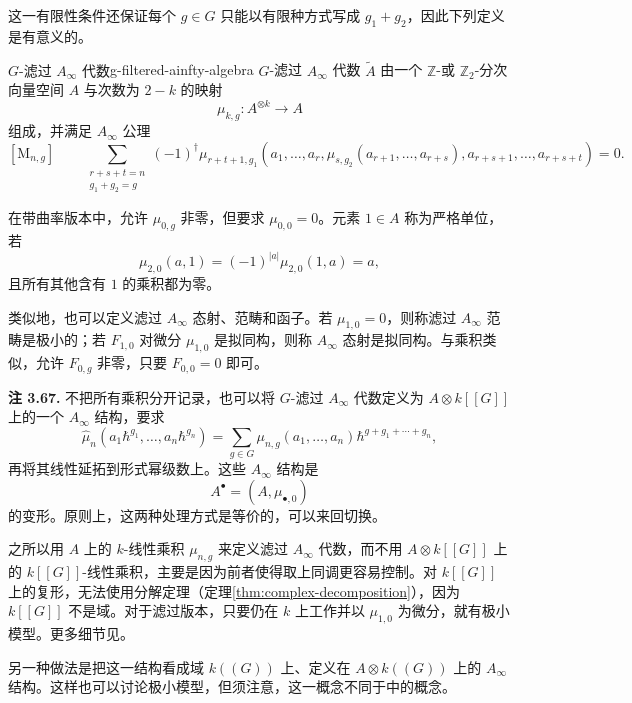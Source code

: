 这一有限性条件还保证每个 $g\in G$ 只能以有限种方式写成 $g_1+g_2$，因此下列定义是有意义的。

\begin{definition}{$G$-滤过 $A_\infty$ 代数}{g-filtered-ainfty-algebra}
$G$-滤过 $A_\infty$ 代数 $\widetilde A$ 由一个 $\mathbb Z$-或 $\mathbb Z_2$-分次向量空间 $A$ 与次数为 $2-k$ 的映射
\[
  \mu_{k,g}\colon A^{\otimes k}\to A
\]
组成，并满足 $A_\infty$ 公理
\[
  [\mathrm M_{n,g}]\qquad
  \sum_{\substack{r+s+t=n\\g_1+g_2=g}}
  (-1)^\dagger\mu_{r+t+1,g_1}
  (a_1,\ldots,a_r,\mu_{s,g_2}(a_{r+1},\ldots,a_{r+s}),
  a_{r+s+1},\ldots,a_{r+s+t})=0.
\]
\end{definition}

在带曲率版本中，允许 $\mu_{0,g}$ 非零，但要求 $\mu_{0,0}=0$。元素 $1\in A$ 称为严格单位，若
\[
  \mu_{2,0}(a,1)=(-1)^{|a|}\mu_{2,0}(1,a)=a,
\]
且所有其他含有 $1$ 的乘积都为零。

类似地，也可以定义滤过 $A_\infty$ 态射、范畴和函子。若 $\mu_{1,0}=0$，则称滤过 $A_\infty$ 范畴是极小的；若 $F_{1,0}$ 对微分 $\mu_{1,0}$ 是拟同构，则称 $A_\infty$ 态射是拟同构。与乘积类似，允许 $F_{0,g}$ 非零，只要 $F_{0,0}=0$ 即可。

\begin{note}\label{note:filtered-ainfty-description}
\textbf{注 3.67.} 不把所有乘积分开记录，也可以将 $G$-滤过 $A_\infty$ 代数定义为 $A\otimes k[[G]]$ 上的一个 $A_\infty$ 结构，要求
\[
  \widehat\mu_n(a_1\hbar^{g_1},\ldots,a_n\hbar^{g_n})
  =\sum_{g\in G}\mu_{n,g}(a_1,\ldots,a_n)
    \hbar^{g+g_1+\cdots+g_n},
\]
再将其线性延拓到形式幂级数上。这些 $A_\infty$ 结构是
\[
  A^\bullet=(A,\mu_{\bullet,0})
\]
的变形。原则上，这两种处理方式是等价的，可以来回切换。

之所以用 $A$ 上的 $k$-线性乘积 $\mu_{n,g}$ 来定义滤过 $A_\infty$ 代数，而不用 $A\otimes k[[G]]$ 上的 $k[[G]]$-线性乘积，主要是因为前者使得取上同调更容易控制。对 $k[[G]]$ 上的复形，无法使用分解定理（定理\ref{thm:complex-decomposition}），因为 $k[[G]]$ 不是域。对于滤过版本，只要仍在 $k$ 上工作并以 $\mu_{1,0}$ 为微分，就有极小模型。更多细节见。

另一种做法是把这一结构看成域 $k((G))$ 上、定义在 $A\otimes k((G))$ 上的 $A_\infty$ 结构。这样也可以讨论极小模型，但须注意，这一概念不同于中的概念。
\end{note}

